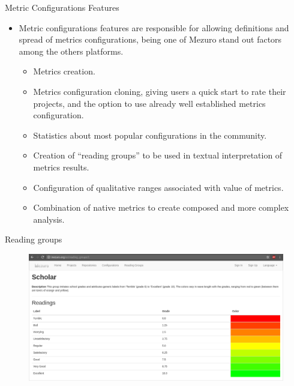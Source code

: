 \begin{block}{Metric Configurations Features}
    \begin{itemize}
        \item Metric configurations features are responsible for allowing
            definitions and spread of metrics configurations, being
            one of Mezuro stand out factors among the others platforms.
            \begin{itemize}
                \item Metrics creation.
                \item Metrics configuration cloning, giving users a quick start
                    to rate their projects, and the option to use already well
                    established metrics configuration.
                \item Statistics about most popular configurations in the
                    community.
                \item Creation of ``reading groups'' to be used in textual
                    interpretation of metrics results.
                \item Configuration of qualitative ranges associated with
                    value of metrics.
                \item Combination of native metrics to create composed and more
                    complex analysis.
            \end{itemize}
    \end{itemize}
\end{block}

\begin{block}{Reading groups}
    \begin{figure}
        \begin{center}
            \includegraphics[width=\textwidth]{figures/ReadingGroup.png}
            \label{fig:feature1}
        \end{center}
    \end{figure}
\end{block}
